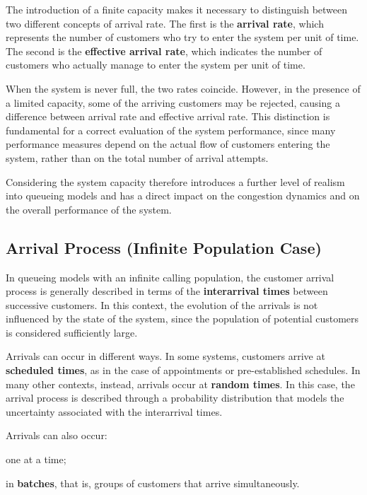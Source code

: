 The introduction of a finite capacity makes it necessary to distinguish between two different concepts of arrival rate. The first is the \textbf{arrival rate}, which represents the number of customers who try to enter the system per unit of time. The second is the \textbf{effective arrival rate}, which indicates the number of customers who actually manage to enter the system per unit of time.

When the system is never full, the two rates coincide. However, in the presence of a limited capacity, some of the arriving customers may be rejected, causing a difference between arrival rate and effective arrival rate. This distinction is fundamental for a correct evaluation of the system performance, since many performance measures depend on the actual flow of customers entering the system, rather than on the total number of arrival attempts.

Considering the system capacity therefore introduces a further level of realism into queueing models and has a direct impact on the congestion dynamics and on the overall performance of the system.

\subsection{Arrival Process (Infinite Population Case)}

In queueing models with an infinite calling population, the customer arrival process is generally described in terms of the \textbf{interarrival times} between successive customers. In this context, the evolution of the arrivals is not influenced by the state of the system, since the population of potential customers is considered sufficiently large.

Arrivals can occur in different ways. In some systems, customers arrive at \textbf{scheduled times}, as in the case of appointments or pre-established schedules. In many other contexts, instead, arrivals occur at \textbf{random times}. In this case, the arrival process is described through a probability distribution that models the uncertainty associated with the interarrival times.

Arrivals can also occur:
\begin{compactitemize}
    \item one at a time;
    \item in \textbf{batches}, that is, groups of customers that arrive simultaneously.
\end{compactitemize}

